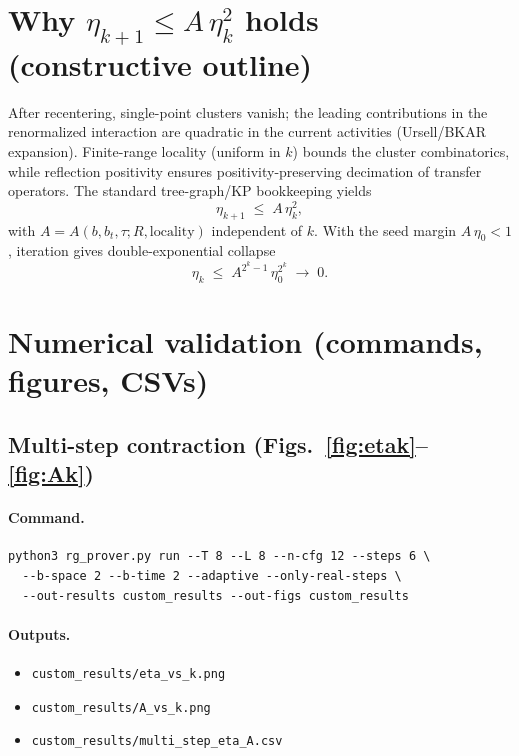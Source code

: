 \documentclass[11pt]{article}
\begin{document}
\section{Why \texorpdfstring{$\eta_{k+1}\le A\,\eta_k^2$}{eta contraction} holds (constructive outline)}

After recentering, single-point clusters vanish; the leading contributions in the renormalized interaction are quadratic in the current activities (Ursell/BKAR expansion). Finite-range locality (uniform in $k$) bounds the cluster combinatorics, while reflection positivity ensures positivity-preserving decimation of transfer operators. The standard tree-graph/KP bookkeeping yields
\begin{equation}
   \boxed{\eta_{k+1} \;\le\; A\,\eta_k^2,}
   \label{eq:quad}
\end{equation}
with $A=A(b,b_t,\tau;R,\text{locality})$ independent of $k$. With the seed margin $A\,\eta_0<1$, iteration gives double-exponential collapse
\begin{equation}
  \eta_k \;\le\; A^{2^k-1}\,\eta_0^{2^k} \;\longrightarrow\; 0.
  \label{eq:doubleexp}
\end{equation}

\section{Numerical validation (commands, figures, CSVs)}

\subsection{Multi-step contraction (Figs.~\ref{fig:etak}--\ref{fig:Ak})}

\paragraph{Command.}
\begin{Verbatim}[fontsize=\small]
python3 rg_prover.py run --T 8 --L 8 --n-cfg 12 --steps 6 \
  --b-space 2 --b-time 2 --adaptive --only-real-steps \
  --out-results custom_results --out-figs custom_results
\end{Verbatim}

\paragraph{Outputs.}
\begin{itemize}
\item \texttt{custom\_results/eta\_vs\_k.png}
\item \texttt{custom\_results/A\_vs\_k.png} 
\item \texttt{custom\_results/multi\_step\_eta\_A.csv}
\end{itemize}
\end{document}
